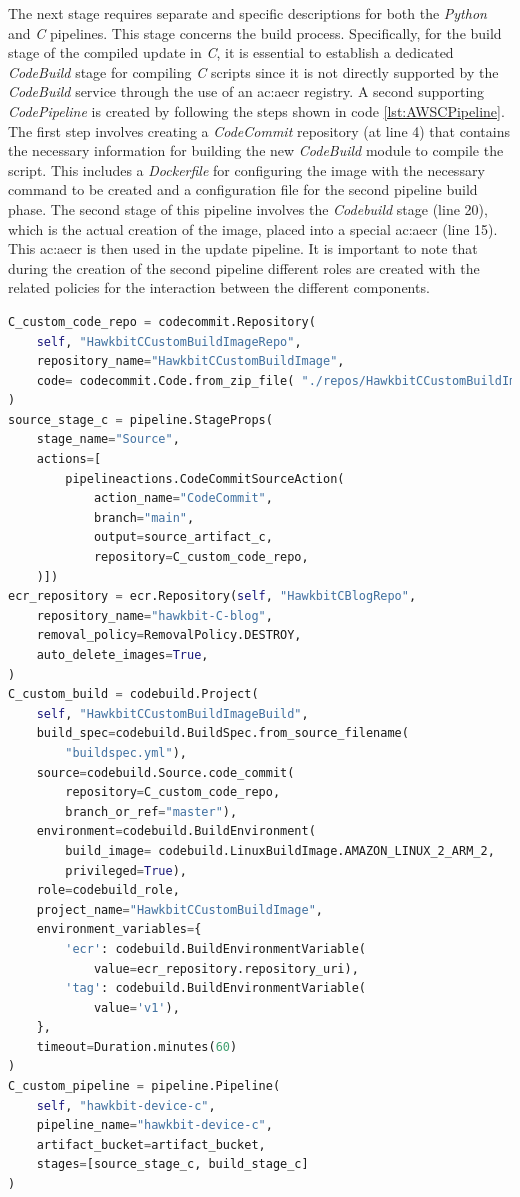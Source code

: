 The next stage requires separate and specific descriptions for both the \textit{Python} and \textit{C} pipelines. This stage concerns the build process. Specifically, for the build stage of the compiled update in \textit{C}, it is essential to establish a dedicated \textit{CodeBuild} stage for compiling \textit{C} scripts since it is not directly supported by the \textit{CodeBuild} service through the use of an \gls{ac:aecr} registry. A second supporting \textit{CodePipeline} is created by following the steps shown in code \ref{lst:AWSCPipeline}. The first step involves creating a \textit{CodeCommit} repository (at line 4) that contains the necessary information for building the new \textit{CodeBuild} module to compile the script. This includes a \textit{Dockerfile} for configuring the image with the necessary command to be created and a configuration file for the second pipeline build phase. The second stage of this pipeline involves the \textit{Codebuild} stage (line 20), which is the actual creation of the image, placed into a special \gls{ac:aecr} (line 15). This \gls{ac:aecr} is then used in the update pipeline. It is important to note that during the creation of the second pipeline different roles are created with the related policies for the interaction between the different components.
\begin{lstlisting}[language=Python, caption={CDK Code for the Codepipeline for the C compiled file build creation}, label=lst:AWSCPipeline]
C_custom_code_repo = codecommit.Repository(
    self, "HawkbitCCustomBuildImageRepo",
    repository_name="HawkbitCCustomBuildImage",
    code= codecommit.Code.from_zip_file( "./repos/HawkbitCCustomBuildImage.zip", "main" )
)
source_stage_c = pipeline.StageProps(
    stage_name="Source",
    actions=[
        pipelineactions.CodeCommitSourceAction(
            action_name="CodeCommit",
            branch="main",
            output=source_artifact_c,
            repository=C_custom_code_repo,
    )])
ecr_repository = ecr.Repository(self, "HawkbitCBlogRepo",
    repository_name="hawkbit-C-blog",
    removal_policy=RemovalPolicy.DESTROY,
    auto_delete_images=True,
)
C_custom_build = codebuild.Project(
    self, "HawkbitCCustomBuildImageBuild",
    build_spec=codebuild.BuildSpec.from_source_filename(
        "buildspec.yml"),
    source=codebuild.Source.code_commit(
        repository=C_custom_code_repo,
        branch_or_ref="master"),
    environment=codebuild.BuildEnvironment(
        build_image= codebuild.LinuxBuildImage.AMAZON_LINUX_2_ARM_2,
        privileged=True),
    role=codebuild_role,
    project_name="HawkbitCCustomBuildImage",
    environment_variables={
        'ecr': codebuild.BuildEnvironmentVariable(
            value=ecr_repository.repository_uri),
        'tag': codebuild.BuildEnvironmentVariable(
            value='v1'),
    },
    timeout=Duration.minutes(60)
)
C_custom_pipeline = pipeline.Pipeline(
    self, "hawkbit-device-c",
    pipeline_name="hawkbit-device-c",
    artifact_bucket=artifact_bucket,
    stages=[source_stage_c, build_stage_c]
)
\end{lstlisting}

